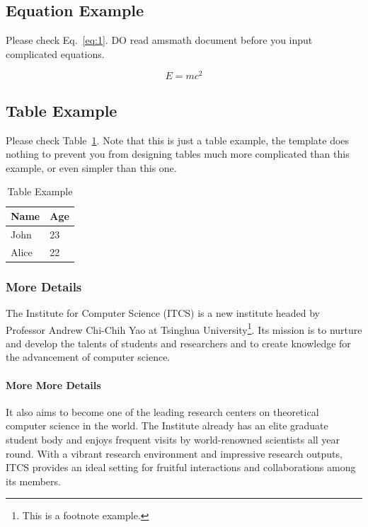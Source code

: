 \documentclass{ics}
\begin{document}
\subsection{Equation Example}
\label{sec:equation-example}
Please check Eq.~\eqref{eq:1}. DO read \textsf{amsmath} document before you
input complicated equations.

\begin{equation}
  \label{eq:1}
  E=mc^{2}
\end{equation}

\subsection{Table Example}
\label{sec:more-more-details-1}
Please check Table~\ref{tab:example}. Note that this is just a table example,
the template does nothing to prevent you from designing tables much more
complicated than this example, or even simpler than this one.

\begin{table}[h]
  \centering
  \caption{Table Example}
  \label{tab:example}
  \begin{tabular}{l|l}
    \hline
    Name & Age \\
    \hline
    John & 23 \\
    \hline
    Alice & 22 \\
    \hline
  \end{tabular}
\end{table}

\subsubsection{More Details}
\label{sec:more-details}
The Institute for Computer Science (ITCS) is a new institute headed by Professor
Andrew Chi-Chih Yao at Tsinghua University\footnote{This is a footnote
  example.}. Its mission is to nurture and develop the talents of students and
researchers and to create knowledge for the advancement of computer science.

\paragraph{More More Details}
\label{sec:more-more-details}
It also aims to become one of the leading research centers on theoretical
computer science in the world. The Institute already has an elite graduate
student body and enjoys frequent visits by world-renowned scientists all year
round. With a vibrant research environment and impressive research outputs, ITCS
provides an ideal setting for fruitful interactions and collaborations among its
members.
\end{document}

